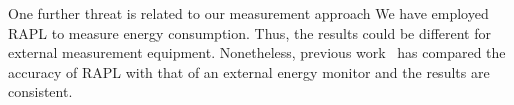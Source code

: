 One further threat is related to our measurement approach We have employed RAPL to measure energy consumption. Thus, the results could be different for external measurement equipment. Nonetheless, previous work~\cite{hahnel:2012} has compared the accuracy of RAPL with that of an external energy monitor and the results are consistent.
